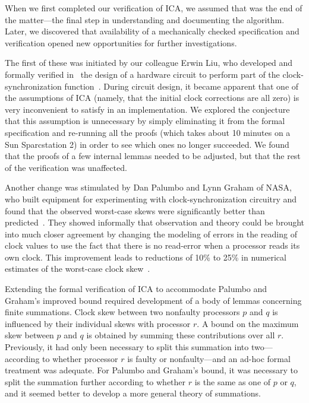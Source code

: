 When we first completed our verification of ICA, we assumed that was
the end of the matter---the final step in understanding and
documenting the algorithm.  Later, we discovered that availability of
a mechanically checked specification and verification opened new
opportunities for further investigations.

The first of these was initiated by our colleague Erwin Liu, who
developed and formally verified in \ehdm\ the design of a hardware circuit to
perform part of the clock-synchronization
function~\cite{Liu93:clocks}.  During circuit design, it became
apparent that one of the assumptions of ICA (namely, that the initial
clock corrections are all zero) is very inconvenient to satisfy in an
implementation.  We explored the conjecture that this assumption is
unnecessary by simply eliminating it from the formal specification
and re-running all the proofs (which takes about 10 minutes on a Sun
{\sc Sparc}station 2) in order to see which ones no longer succeeded.
We found that the proofs of a few internal lemmas needed to be
adjusted, but that the rest of the verification was unaffected.

Another change was stimulated by Dan Palumbo and Lynn Graham of NASA,
who built equipment for experimenting with clock-synchronization
circuitry and found that the observed worst-case skews were
significantly better than predicted~\cite{Palumbo92:clocksTP}.  They
showed informally that observation and theory could be brought into
much closer agreement by changing the modeling of errors in the
reading of clock values to use the fact that there is no read-error
when a processor reads its own clock.  This improvement leads to
reductions of 10\% to 25\% in numerical estimates of the worst-case
clock skew~\cite{Rushby94:icah}.

Extending the formal verification
of ICA to accommodate Palumbo and Graham's improved bound required
development of a body of lemmas concerning finite summations.  Clock
skew between two nonfaulty processors $p$ and $q$ is influenced by
their individual skews with processor $r$.  A bound on the maximum
skew between $p$ and $q$ is obtained by summing these contributions
over all $r$.  Previously, it had only been necessary to split this
summation into two---according to whether processor $r$ is faulty or
nonfaulty---and an ad-hoc formal treatment was adequate.  For Palumbo and
Graham's bound, it was necessary to split the summation further
according to whether $r$ is the same as one of $p$ or $q$, and it
seemed better to develop a more general theory of summations.  

